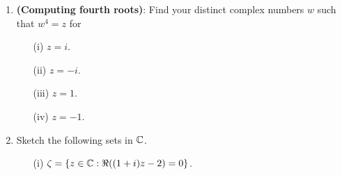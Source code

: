 \documentclass[a4paper]{article}
\begin{document}
\begin{enumerate}
\begin{proof}
\begin{align*}
            w^{n} &= \Bigg(  \gamma^{1/n} \Bigg[  \cos \Bigg(  \frac{ \varphi + 2 \pi k  }{ n  } \Big)  + i \sin \Big(  \frac{ \varphi + 2 \pi k  }{ n  }  \Big) \Bigg] \Bigg)^{n} \\
                  &= (\gamma^{1/n})^{n} \Bigg[ \cos \Big(  \frac{ \varphi + 2 \pi k  }{ n  } \Big)  + i \sin \Big(  \frac{ \varphi + 2 \pi k  }{ n  }  \Big) \Bigg]^{n} \\
                  &= \gamma \Bigg[ \cos \Big( n \cdot  \frac{ \varphi + 2 \pi k  }{ n }  \Big) + i \sin \Big(  n \cdot \frac{  \varphi + 2 \pi k  }{ n  }  \Big) \Bigg] \\   
                  &= \gamma (\cos \varphi + i \sin \varphi) \\
                  &= z
        \end{align*}
        which ends our proof.
        \end{proof}
    \item \textbf{(Computing fourth roots)}: Find your distinct complex numbers \( w  \) such that \( w^{4} = z  \) for 
        \begin{enumerate}
            \item[(i)] \( z = i  \).
                \begin{solution}
                
                \end{solution}
            \item[(ii)] \( z = -i \).
                \begin{solution}
                
                \end{solution}
            \item[(iii)] \( z = 1  \).
                \begin{solution}
                
                \end{solution}
            \item[(iv)] \( z = -1  \).
                \begin{solution}
                
                \end{solution}
        \end{enumerate}
    \item Sketch the following sets in \( \mathbb{C}  \).
        \begin{enumerate}
            \item[(i)] \( \zeta = \{ z \in \mathbb{C} : \Re((1+i)z - 2) = 0 \}   \).
                \begin{solution}
                

\end{solution}
\end{enumerate}
\end{enumerate}
\end{document}
